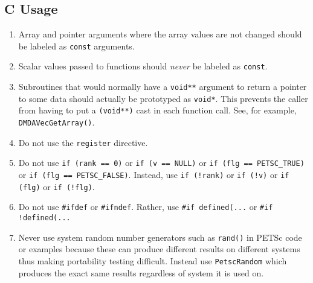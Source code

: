 \subsection{C Usage}
\begin{enumerate}
\item Array and pointer arguments where the array values are not changed should be labeled as \lstinline{const} arguments.
\item Scalar values passed to functions should {\em never} be labeled as \lstinline{const}.
\item Subroutines that would normally have a \lstinline{void**} argument to return a pointer to some data should
actually be prototyped as \lstinline{void*}. This prevents the caller from having to put a \lstinline{(void**)} cast in each function call. See, for example, \lstinline{DMDAVecGetArray()}.
\item Do not use the \lstinline{register} directive.
\item Do not use \lstinline{if (rank == 0)} or \lstinline{if (v == NULL)} or \lstinline{if (flg == PETSC_TRUE)} or \lstinline{if (flg == PETSC_FALSE)}.
Instead, use \lstinline{if (!rank)} or \lstinline{if (!v)} or \lstinline{if (flg)} or \lstinline{if (!flg)}.
\item Do not use \lstinline{#ifdef} or \lstinline{#ifndef}. Rather, use \lstinline{#if defined(...} or \lstinline{#if !defined(...}
\item Never use system random number generators such as \lstinline{rand()} in PETSc code or examples because these can produce different results
on different systems thus making portability testing difficult. Instead use \lstinline{PetscRandom} which produces the exact same results regardless of
system it is used on.
\end{enumerate}


